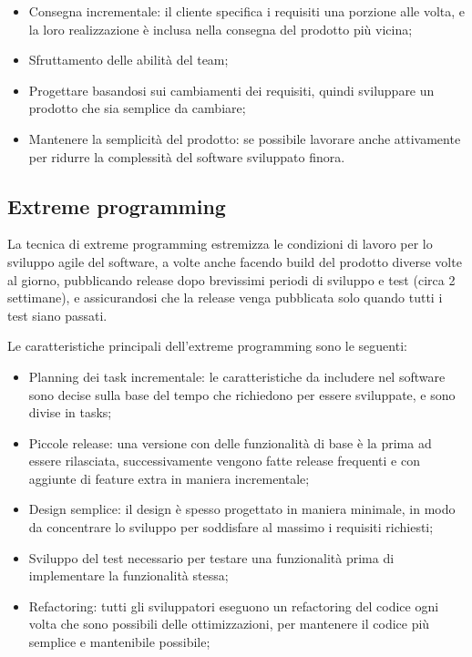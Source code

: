 \documentclass[a4paper, 10pt]{article}
\begin{document}
\begin{enumerate}
\begin{itemize}
			\item Consegna incrementale: il cliente specifica i requisiti una porzione alle volta, e la loro realizzazione è inclusa nella consegna del prodotto più vicina;
			
			\item Sfruttamento delle abilità del team;
			
			\item Progettare basandosi sui cambiamenti dei requisiti, quindi sviluppare un prodotto che sia semplice da cambiare;
			
			\item Mantenere la semplicità del prodotto: se possibile lavorare anche attivamente per ridurre la complessità del software sviluppato finora.
		\end{itemize}
	
		\subsection{Extreme programming}
		La tecnica di extreme programming estremizza le condizioni di lavoro per lo sviluppo agile del software, a volte anche facendo build del prodotto diverse volte al giorno, pubblicando release dopo brevissimi periodi di sviluppo e test (circa 2 settimane), e assicurandosi che la release venga pubblicata solo quando tutti i test siano passati.
		
		Le caratteristiche principali dell'extreme programming sono le seguenti:
		\begin{itemize}
			\item Planning dei task incrementale: le caratteristiche da includere nel software sono decise sulla base del tempo che richiedono per essere sviluppate, e sono divise in tasks;
			
			\item Piccole release: una versione con delle funzionalità di base è la prima ad essere rilasciata, successivamente vengono fatte release frequenti e con aggiunte di feature extra in maniera incrementale;
			
			\item Design semplice: il design è spesso progettato in maniera minimale, in modo da concentrare lo sviluppo per soddisfare al massimo i requisiti richiesti;
			
			\item Sviluppo del test necessario per testare una funzionalità prima di implementare la funzionalità stessa;
			
			\item Refactoring: tutti gli sviluppatori eseguono un refactoring del codice ogni volta che sono possibili delle ottimizzazioni, per mantenere il codice più semplice e mantenibile possibile;
			

\end{itemize}
\end{enumerate}
\end{document}
